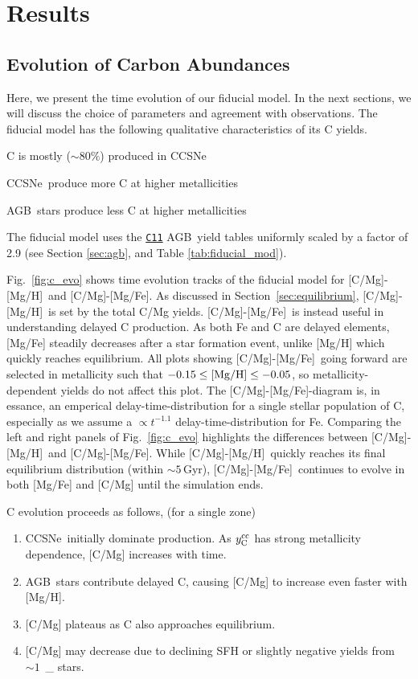 \documentclass[fleqn,
usenatbib]{mnras}
\newcommand{\cxi}{\texttt{\hyperlink{C11}{C11}}}
\newcommand{\agb}{AGB}
\newcommand{\cc}{CCSNe}
\newcommand{\caah}{[C/Mg]-[Mg/H]}
\newcommand{\caafe}{[C/Mg]-[Mg/Fe]}
\newcommand{\Ycc}{\ensuremath{y_{\rm C}^{\rm cc}}}
\newcommand{\Mo}{%
    \ifmmode {\rm M}_{\sun}%
    \else {M$_{\sun}$}%
    \fi}
\newcommand{\about}[1]{${\sim} #1$}
\begin{document}
\section{Results}

\subsection{Evolution of Carbon Abundances}

Here, we present the time evolution of our fiducial model. In the next sections, we will discuss the choice of parameters and agreement with observations. 
The fiducial model has the following qualitative characteristics of its C yields.
\begin{description}
    \item C is mostly (\about{80\%}) produced in \cc
    \item \cc\ produce more C at higher metallicities
    \item \agb\ stars produce less C at higher metallicities 
\end{description} 
The fiducial model uses the \cxi{} \agb\ yield tables uniformly scaled by a factor of 2.9 (see Section \ref{sec:agb}, and Table \ref{tab:fiducial_mod}). 

Fig.~\ref{fig:c_evo} shows time evolution tracks of the fiducial model for \caah\ and \caafe. 
As discussed in Section~\ref{sec:equilibrium}, \caah\ is set by the total C/Mg yields. 
\caafe\ is instead useful in understanding delayed C production. 
As both Fe and C are delayed elements, [Mg/Fe] steadily decreases after a star formation event, unlike [Mg/H] which quickly reaches equilibrium.  All plots showing \caafe\ going forward are selected in metallicity such that $-0.15 \leq {\rm [Mg/H]} \leq -0.05$, so metallicity-dependent yields do not affect this plot. 
The \caafe{}-diagram is, in essance, an emperical delay-time-distribution for a single stellar population of C, especially as we assume a $\propto t^{-1.1}$ delay-time-distribution for Fe. 
Comparing the left and right panels of Fig.~\ref{fig:c_evo} highlights the differences between \caah\ and \caafe. While \caah\ quickly reaches its final equilibrium distribution (within \about{5}\,Gyr), \caafe\ continues to evolve in both [Mg/Fe] and [C/Mg] until the simulation ends.

C evolution proceeds as follows, (for a single zone)
\begin{enumerate}
    \item \cc\ initially dominate production. As $\Ycc$ has strong metallicity dependence, [C/Mg] increases with time. 
    \item \agb\ stars contribute delayed C, causing [C/Mg] to increase even faster with [Mg/H]. 
    \item{} [C/Mg] plateaus as C also approaches equilibrium. 
    \item{} [C/Mg] may decrease due to declining SFH or slightly negative yields from \about{1}\,\Mo stars.

\end{enumerate}
\end{document}
